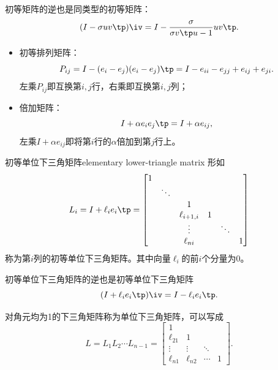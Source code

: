 \begin{corollary}
    初等矩阵的逆也是同类型的初等矩阵：
    \begin{equation}
        (I-\sigma uv\tp)\iv=I-\frac{\sigma}{\sigma v\tp u-1}uv\tp.
    \end{equation}
\end{corollary}

\begin{example}
    {}{}
    \begin{itemize}
        \item 初等排列矩阵：
        \[
            P_{ij}=I-(e_i-e_j)(e_i-e_j)\tp=I-e_{ii}-e_{jj}+e_{ij}+e_{ji}.
        \]
        左乘$P_{ij}$即互换第$i,j$行，右乘即互换第$i,j$列；
        \item 倍加矩阵：
        \[
            I+\alpha e_ie_j\tp=I+\alpha e_{ij},
        \]
        左乘$I+\alpha e_{ij}$即将第$i$行的$\alpha$倍加到第$j$行上。
    \end{itemize}
\end{example}

\begin{definition}
    {初等单位下三角矩阵}{elementary lower-triangle matrix}
    形如
    \begin{equation}
        L_i=I+\ell_ie_i\tp=\begin{bmatrix}
            1\\ &\ddots\\ &&1\\ &&\ell_{i+1,i}&1\\ &&\vdots&&\ddots\\ &&\ell_{ni}&&&1
        \end{bmatrix}
    \end{equation}
    称为第$i$列的初等单位下三角矩阵。其中向量$\ell_i$的前$i$个分量为0。
\end{definition}

\begin{corollary}
    初等单位下三角矩阵的逆也是初等单位下三角矩阵
    \begin{equation}
        (I+\ell_ie_i\tp)\iv=I-\ell_ie_i\tp.
    \end{equation}
\end{corollary}

\begin{corollary}
    对角元均为1的下三角矩阵称为单位下三角矩阵，可以写成
    \[
        L=L_1L_2\cdots L_{n-1}=\begin{bmatrix}
            1\\\ell_{21}&1\\ \vdots&\vdots&\ddots\\
            \ell_{n1}&\ell_{n2}&\cdots&1
        \end{bmatrix}.
    \]
\end{corollary}

